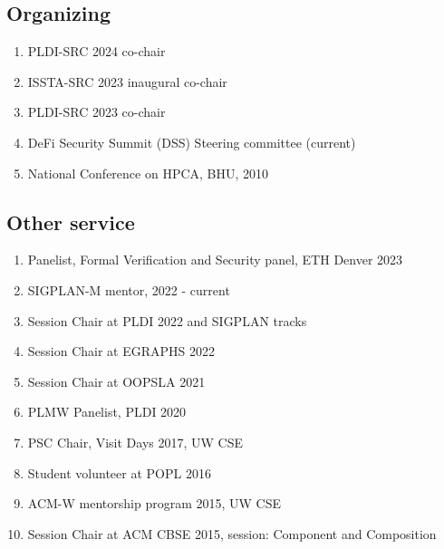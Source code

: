 \documentclass[margin, 10pt]{res} %
\begin{document}
\begin{resume}
\subsection{Organizing}
\begin{enumerate}[itemsep=-2pt]
  \item PLDI-SRC 2024 co-chair
  \item ISSTA-SRC 2023 inaugural co-chair
  \item PLDI-SRC 2023 co-chair
  \item DeFi Security Summit (DSS) Steering committee (current)
  \item National Conference on HPCA, BHU, 2010
\end{enumerate}

\subsection{Other service}
\begin{enumerate}[itemsep=-2pt]
\item {Panelist, Formal Verification and Security panel, ETH Denver 2023}
\item SIGPLAN-M mentor, 2022 - current
\item Session Chair at PLDI 2022 and SIGPLAN tracks
\item Session Chair at EGRAPHS 2022
\item Session Chair at OOPSLA 2021
\item PLMW Panelist, PLDI 2020
\item PSC Chair, Visit Days 2017, UW CSE
\item Student volunteer at POPL 2016
\item ACM-W mentorship program 2015, UW CSE
\item Session Chair at ACM CBSE 2015, session: Component and Composition
\end{enumerate}


\end{resume}
\end{document}
